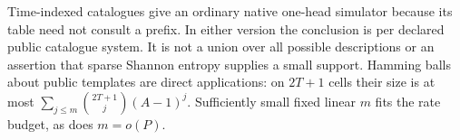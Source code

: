 Time-indexed catalogues give an ordinary native one-head simulator because
its table need not consult a prefix. In either version the conclusion is
per declared public catalogue system. It is not a union over all possible
descriptions or an assertion that sparse Shannon entropy supplies a small
support. Hamming balls about public templates are direct applications: on
$2T+1$ cells their size is at most
$\sum_{j\le m}\binom{2T+1}{j}(A-1)^j$. Sufficiently small fixed linear
$m$ fits the rate budget, as does $m=o(P)$.
